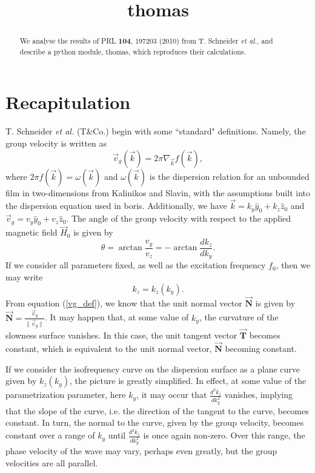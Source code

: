 \documentclass{article}
\title{thomas}
\begin{document}
\maketitle
\begin{abstract}
We analyse the results of PRL \textbf{104}, 197203 (2010) from T. Schneider \textit{et al.}, and describe a python module, thomas, which reproduces their calculations.
\end{abstract}
\section{Recapitulation}
T. Schneider \textit{et al.} (T\&{}Co.) begin with some ``standard" definitions. Namely, the group velocity is written as
\begin{equation}\label{vg_def}
\vec{v}_{g} (\vec{k}) = 2 \pi \nabla_{\vec{k}} f(\vec{k}),
\end{equation}
where $2 \pi f (\vec{k}) = \omega (\vec{k})$ and $\omega (\vec{k})$ is the dispersion relation for an unbounded film in two-dimensions from Kalinikos and Slavin, with the assumptions built into the dispersion equation used in boris. Additionally, we have $\vec{k} = k_{y} \hat{y}_{0} + k_{z} \hat{z}_{0}$ and $\vec{v}_{g} = v_{y} \hat{y}_{0} + v_{z} \hat{z}_{0}$. The angle of the group velocity with respect to the applied magnetic field $\vec{H}_{0}$ is given by
\begin{equation}\label{vg_angle}
\theta = \arctan{\frac{v_{y}}{v_{z}}} = - \arctan{\frac{d k_{z}}{d k_{y}}}.
\end{equation}
If we consider all parameters fixed, as well as the excitation frequency $f_{0}$, then we may write
\begin{equation}
k_{z} = k_{z} (k_{y}).
\end{equation}
From equation (\ref{vg_def}), we know that the unit normal vector $\vec{\textbf{N}}$ is given by $\vec{\textbf{N}} = \frac{\vec{v}_{g}}{\| \vec{v}_{g} \|}$. It may happen that, at some value of $k_{y}$, the curvature of the slowness surface vanishes. In this case, the unit tangent vector $\vec{\textbf{T}}$ becomes constant, which is equivalent to the unit normal vector, $\vec{\textbf{N}}$ becoming constant. 

If we consider the isofrequency curve on the dispersion surface as a plane curve given by $k_{z} ( k_{y} )$, the picture is greatly simplified. In effect, at some value of the parametrization parameter, here $k_{y}$, it may occur that $\frac{d^2 k_{z}}{d k_{y}^2}$ vanishes, implying that the slope of the curve, i.e. the direction of the tangent to the curve, becomes constant. In turn, the normal to the curve, given by the group velocity, becomes constant over a range of $k_{y}$ until $\frac{d^2 k_{z}}{d k_{y}^2}$ is once again non-zero. Over this range, the phase velocity of the wave may vary, perhaps even greatly, but the group velocities are all parallel.
\end{document}
